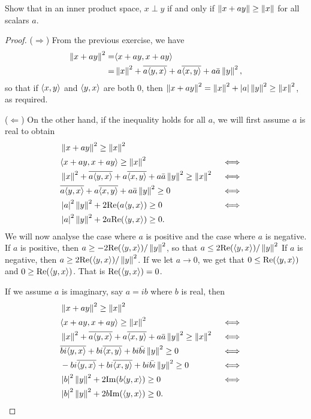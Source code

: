 \begin{exercise}{8}
Show that in an inner product space, $x\perp y$ if and only if $\left\lVert x+ay\right\rVert\geq\left\lVert x\right\rVert$ for all scalars $a$.
\end{exercise}
\begin{proof}
($\Rightarrow$)
From the previous exercise, we have
\begin{align*}
    \left\lVert x+ay\right\rVert^2
    =& \langle x+ay, x+ay\rangle\\
    =& \left\lVert x\right\rVert^2 + \overline{a\langle y, x\rangle}
    + a\overline{\langle x,y\rangle} + a\bar{a}\left\lVert y\right\rVert^2,
\end{align*}
so that if $\langle x,y\rangle$ and $\langle y,x\rangle$ are both 0, then $\left\lVert x+ay\right\rVert^2 =\left\lVert x\right\rVert^2+\left\lvert a\right\rvert\left\lVert y\right\rVert^2 \geq\left\lVert x\right\rVert^2$, as required.

($\Leftarrow$)
On the other hand, if the inequality holds for all $a$, we will first assume $a$ is real to obtain
\begin{align*}
    &\left\lVert x+ay\right\rVert^2
    \geq \left\lVert x\right\rVert^2\\
    &\langle x+ay, x+ay\rangle
    \geq \left\lVert x\right\rVert^2 &&\iff\\
    &\left\lVert x\right\rVert^2 + \overline{a\langle y, x\rangle}
    + a\overline{\langle x,y\rangle} + a\bar{a}\left\lVert y\right\rVert^2
    \geq \left\lVert x\right\rVert^2 &&\iff\\
    &\overline{a\langle y, x\rangle}
    + a\overline{\langle x,y\rangle} + a\bar{a}\left\lVert y\right\rVert^2
    \geq 0 &&\iff\\
    &\left\lvert a\right\rvert^2\left\lVert y\right\rVert^2 + 2\text{Re}(a\langle y, x\rangle)
    \geq 0 &&\iff\\
    &\left\lvert a\right\rvert^2\left\lVert y\right\rVert^2 + 2a\text{Re}(\langle y, x\rangle) \geq 0.
\end{align*}
We will now analyse the case where $a$ is positive and the case where $a$ is negative.
If $a$ is positive, then 
$a\geq -2\text{Re}(\langle y,x\rangle)/\left\lVert y\right\rVert^2$, so that $a\leq 2\text{Re}(\langle y,x\rangle)/\left\lVert y\right\rVert^2$
If $a$ is negative, then
$a\geq 2\text{Re}(\langle y,x\rangle)/\left\lVert y\right\rVert^2$.
If we let $a\to 0$, we get that $0\leq\text{Re}(\langle y,x\rangle)$ and $0\geq\text{Re}(\langle y,x\rangle)$.
That is $\text{Re}(\langle y,x\rangle)=0$.

If we assume $a$ is imaginary, say $a=ib$ where $b$ is real, then
\begin{align*}
    &\left\lVert x+ay\right\rVert^2
    \geq \left\lVert x\right\rVert^2\\
    &\langle x+ay, x+ay\rangle
    \geq \left\lVert x\right\rVert^2 &&\iff\\
    &\left\lVert x\right\rVert^2 + \overline{a\langle y, x\rangle}
    + a\overline{\langle x,y\rangle} + a\bar{a}\left\lVert y\right\rVert^2
    \geq \left\lVert x\right\rVert^2 &&\iff\\
    &\overline{bi\langle y, x\rangle}
    + bi\overline{\langle x,y\rangle} + bi\bar{bi}\left\lVert y\right\rVert^2
    \geq 0 &&\iff\\
    &-bi\overline{\langle y, x\rangle}
    + bi\overline{\langle x,y\rangle} + bi\bar{bi}\left\lVert y\right\rVert^2
    \geq 0 &&\iff\\
    &\left\lvert b\right\rvert^2\left\lVert y\right\rVert^2 + 2\text{Im}(b\langle y, x\rangle)
    \geq 0 &&\iff\\
    &\left\lvert b\right\rvert^2\left\lVert y\right\rVert^2 + 2b\text{Im}(\langle y, x\rangle) \geq 0.
\end{align*}


\end{proof}

